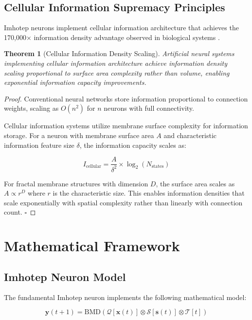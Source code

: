 \documentclass[12pt,a4paper]{article}
\newtheorem{theorem}{Theorem}[section]
\theoremstyle{remark}
\begin{document}
\subsection{Cellular Information Supremacy Principles}

Imhotep neurons implement cellular information architecture that achieves the 170,000× information density advantage observed in biological systems \cite{sachikonye2024intracellular}.

\begin{theorem}[Cellular Information Density Scaling]
Artificial neural systems implementing cellular information architecture achieve information density scaling proportional to surface area complexity rather than volume, enabling exponential information capacity improvements.
\end{theorem}

\begin{proof}
Conventional neural networks store information proportional to connection weights, scaling as $O(n^2)$ for $n$ neurons with full connectivity.

Cellular information systems utilize membrane surface complexity for information storage. For a neuron with membrane surface area $A$ and characteristic information feature size $\delta$, the information capacity scales as:

\begin{equation}
I_{\text{cellular}} = \frac{A}{\delta^2} \times \log_2(N_{\text{states}})
\end{equation}

For fractal membrane structures with dimension $D$, the surface area scales as $A \propto r^D$ where $r$ is the characteristic size. This enables information densities that scale exponentially with spatial complexity rather than linearly with connection count. $\square$
\end{proof}

\section{Mathematical Framework}

\subsection{Imhotep Neuron Model}

The fundamental Imhotep neuron implements the following mathematical model:

\begin{equation}
\mathbf{y}(t+1) = \text{BMD}\left(\mathcal{Q}[\mathbf{x}(t)] \otimes \mathcal{S}[\mathbf{s}(t)] \otimes \mathcal{T}[t]\right)
\end{equation}
\end{document}
